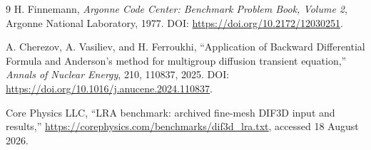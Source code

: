 \documentclass[10pt]{article}
\begin{document}
\begin{thebibliography}{9}
H. Finnemann, \emph{Argonne Code Center: Benchmark Problem Book, Volume 2},
Argonne National Laboratory, 1977. DOI: \url{https://doi.org/10.2172/12030251}.

A. Cherezov, A. Vasiliev, and H. Ferroukhi,
``Application of Backward Differential Formula and Anderson's method for
multigroup diffusion transient equation,'' \emph{Annals of Nuclear Energy},
210, 110837, 2025. DOI:
\url{https://doi.org/10.1016/j.anucene.2024.110837}.

Core Physics LLC, ``LRA benchmark: archived fine-mesh DIF3D input and
results,'' \url{https://corephysics.com/benchmarks/dif3d_lra.txt}, accessed
18 August 2026.
\end{thebibliography}
\end{document}
